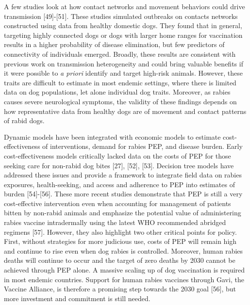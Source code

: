 \documentclass[
  oneside]{book}
\begin{document}
A few studies look at how contact networks and movement behaviors could
drive transmission {[}49{]}-{[}51{]}. These studies simulated outbreaks on
contacts networks constructed using data from healthy domestic dogs.
They found that in general, targeting highly connected dogs or dogs with
larger home ranges for vaccination results in a higher probability of
disease elimination, but few predictors of connectivity of individuals
emerged. Broadly, these results are consistent with previous work on
transmission heterogeneity and could bring valuable benefits if it were
possible to \emph{a priori} identify and target high-risk animals. However,
these traits are difficult to estimate in most endemic settings, where
there is limited data on dog populations, let alone individual dog
traits. Moreover, as rabies causes severe neurological symptoms, the
validity of these findings depends on how representative data from
healthy dogs are of movement and contact patterns of rabid dogs.

Dynamic models have been integrated with economic models to estimate
cost-effectiveness of interventions, demand for rabies PEP, and disease
burden. Early cost-effectiveness models critically lacked data on the
costs of PEP for those seeking care for non-rabid dog bites {[}27{]},
{[}52{]}, {[}53{]}. Decision tree models have addressed these issues and
provide a framework to integrate field data on rabies exposures,
health-seeking, and access and adherence to PEP into estimates of burden
{[}54{]}-{[}56{]}. These more recent studies demonstrate that PEP is still a
very cost-effective intervention even when accounting for management of
patients bitten by non-rabid animals and emphasize the potential value
of administering rabies vaccine intradermally using the latest WHO
recommended abridged regimens {[}57{]}. However, they also highlight two
other critical points for policy. First, without strategies for more
judicious use, costs of PEP will remain high and continue to rise even
when dog rabies is controlled. Moreover, human rabies deaths will
continue to occur and the target of zero deaths by 2030 cannot be
achieved through PEP alone. A massive scaling up of dog vaccination is
required in most endemic countries. Support for human rabies vaccines
through Gavi, the Vaccine Alliance, is therefore a promising step
towards the 2030 goal {[}56{]}, but more investment and commitment is
still needed.
\end{document}

